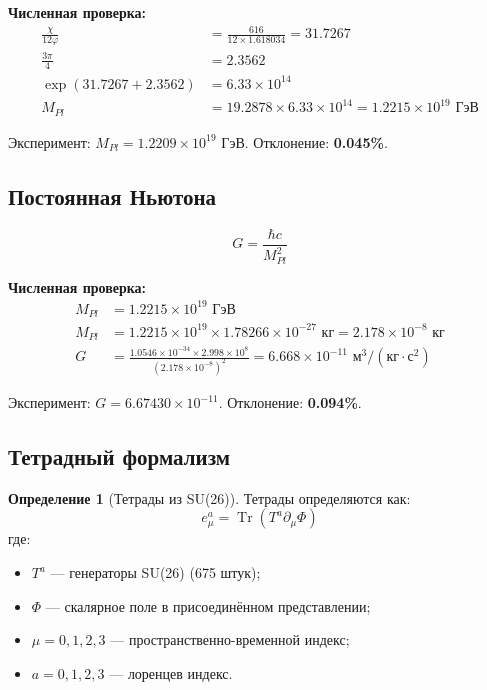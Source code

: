 \documentclass[12pt,a4paper,twoside]{article}
\DeclareMathOperator{\Tr}{Tr}
\theoremstyle{definition}
\newtheorem{definition}{Определение}[section]
\begin{document}
\textbf{Численная проверка:}
\begin{align}
\frac{\chi}{12\varphi} &= \frac{616}{12 \times 1.618034} = 31.7267 \\
\frac{3\pi}{4} &= 2.3562 \\
\exp(31.7267 + 2.3562) &= 6.33 \times 10^{14} \\
M_{Pl} &= 19.2878 \times 6.33 \times 10^{14} = 1.2215 \times 10^{19} \text{ ГэВ}
\end{align}

Эксперимент: $M_{Pl} = 1.2209 \times 10^{19}$ ГэВ. Отклонение: \textbf{0.045\%}.

\subsection{Постоянная Ньютона}

\begin{equation}
G = \frac{\hbar c}{M_{Pl}^2}
\label{eq:newton}
\end{equation}

\textbf{Численная проверка:}
\begin{align}
M_{Pl} &= 1.2215 \times 10^{19} \text{ ГэВ} \\
M_{Pl} &= 1.2215 \times 10^{19} \times 1.78266 \times 10^{-27} \text{ кг} = 2.178 \times 10^{-8} \text{ кг} \\
G &= \frac{1.0546 \times 10^{-34} \times 2.998 \times 10^8}{(2.178 \times 10^{-8})^2} = 6.668 \times 10^{-11} \text{ м}^3/(\text{кг}\cdot\text{с}^2)
\end{align}

Эксперимент: $G = 6.67430 \times 10^{-11}$. Отклонение: \textbf{0.094\%}.

\subsection{Тетрадный формализм}

\begin{definition}[Тетрады из SU(26)]
Тетрады определяются как:
\begin{equation}
e_\mu^a = \Tr(T^a \partial_\mu \Phi)
\end{equation}
где:
\begin{itemize}
    \item $T^a$ — генераторы SU(26) (675 штук);
    \item $\Phi$ — скалярное поле в присоединённом представлении;
    \item $\mu = 0,1,2,3$ — пространственно-временной индекс;
    \item $a = 0,1,2,3$ — лоренцев индекс.
\end{itemize}
\end{definition}
\end{document}
